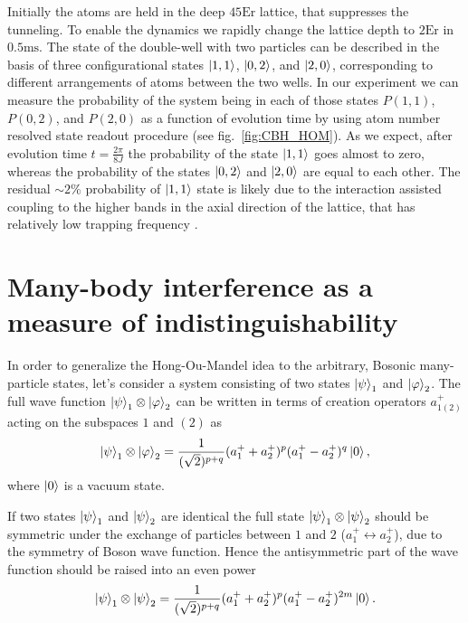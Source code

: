 Initially the atoms are held in the deep $45 \textrm{Er}$ lattice, that suppresses  the tunneling. To enable the dynamics we rapidly change the lattice depth to $2\textrm{Er}$ in $0.5\textrm{ms}$. The state of the double-well with two particles can be described in the basis of three configurational states $\left|1,1\right\rangle$, $\left|0,2\right\rangle$, and $\left|2,0\right\rangle$, corresponding to different arrangements of atoms between the two wells. In our experiment we can measure the probability of the system being in each of those states $P(1,1)$, $P(0,2)$, and $P(2,0)$ as a function of evolution time by using atom number resolved state readout procedure (see fig.~\ref{fig:CBH_HOM}). As we expect, after evolution time $t= \frac{2 \pi}{8J}$ the probability of the state $\left|1,1\right\rangle$ goes almost to zero, whereas the probability of the states $\left|0,2\right\rangle$ and $\left|2,0\right\rangle$ are equal to each other. The residual $\sim 2\%$ probability of $\left|1,1\right\rangle$ state is likely due to the interaction assisted coupling to the higher bands in the axial direction of the lattice, that has relatively low trapping frequency \cite{Preiss thesis}. 

\section{Many-body interference as a measure of indistinguishability}
In order to generalize the Hong-Ou-Mandel idea to the arbitrary, Bosonic many-particle states, let's consider a system consisting of two states $\left|\psi\right\rangle_1$ and $\left|\varphi\right\rangle_2$. The full wave function $\left|\psi\right\rangle_1 \otimes \left|\varphi\right\rangle_2$ can be written in terms of creation operators $a_{1(2)}^+$ acting on the subspaces $1$ and $(2)$ as
\begin{equation}
\left|\psi\right\rangle_1 \otimes \left|\varphi\right\rangle_2 = \frac{1}{(\sqrt{2})^{p+q}}(a^+_1 + a^+_2)^p(a^+_1 - a^+_2)^q\left|0\right\rangle,
\end{equation}
where $\left|0\right\rangle$ is a vacuum state.

If two states $\left|\psi\right\rangle_1$ and $\left|\psi\right\rangle_2$ are identical the full state $\left|\psi\right\rangle_1 \otimes \left|\psi\right\rangle_2$ should be symmetric under the exchange of particles between $1$ and $2$ ($a_{1}^+ \leftrightarrow a_2^+$), due to the symmetry of Boson wave function. Hence the antisymmetric part of the wave function should be raised into an even power
\begin{equation}
\left|\psi\right\rangle_1 \otimes \left|\psi\right\rangle_2 = \frac{1}{(\sqrt{2})^{p+q}}(a^+_1 + a^+_2)^p(a^+_1 - a^+_2)^{2m}\left|0\right\rangle.
\end{equation}

